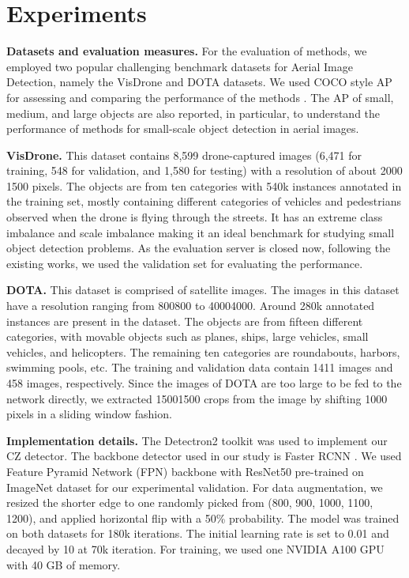 

\section{Experiments}
\label{sec:experiments}

\noindent \textbf{Datasets and evaluation measures.} For the evaluation of methods, we employed two popular challenging benchmark datasets for Aerial Image Detection, namely the VisDrone \cite{zhu-VisDrone-2018} and DOTA \cite{xia-DOTA-2018} datasets. We used COCO style AP for assessing and comparing the performance of the methods \cite{mscoco-Lin-2014}. The AP of small, medium, and large objects are also reported, in particular, to understand the performance of methods for small-scale object detection in aerial images. 

\noindent \textbf{VisDrone.} This dataset contains  8,599 drone-captured images (6,471 for training, 548 for validation, and 1,580 for testing) with a resolution of about 2000 1500 pixels. The objects are from ten categories with 540k instances annotated in the training set, mostly containing different categories of vehicles and pedestrians observed when the drone is flying through the streets. It has an extreme class imbalance and scale imbalance making it an ideal benchmark for studying small object detection problems. As the evaluation server is closed now, following the existing works, we used the validation set for evaluating the performance.

\noindent \textbf{DOTA.} This dataset is comprised of satellite images. The images in this dataset have a resolution ranging from 800800 to 40004000. Around 280k annotated instances are present in the dataset. The objects are from fifteen different categories, with movable objects such as planes, ships, large vehicles, small vehicles, and helicopters. The remaining ten categories are roundabouts, harbors, swimming pools, etc. The training and validation data contain 1411 images and 458 images, respectively. Since the images of DOTA are too large to be fed to the network directly, we extracted 15001500 crops from the image by shifting 1000 pixels in a sliding window fashion.

\noindent \textbf{Implementation details.} The Detectron2 toolkit \cite{detectron2-wu-2019} was used to implement our CZ detector. The backbone detector used in our study is Faster RCNN \cite{faster_rcnn-Ren-2015}. We used Feature Pyramid Network (FPN) \cite{fpn-Lin-2017} backbone with ResNet50 \cite{resnet-He-2016}  pre-trained on ImageNet \cite{imagenet-Russakovsky-2015} dataset for our experimental validation. For data augmentation, we resized the shorter edge to one randomly picked from (800, 900, 1000, 1100, 1200), and applied horizontal flip with a 50\% probability. The model was trained on both datasets for 180k iterations. The initial learning rate is set to 0.01 and decayed by 10 at 70k iteration. For training, we used one NVIDIA A100 GPU with 40 GB of memory.


